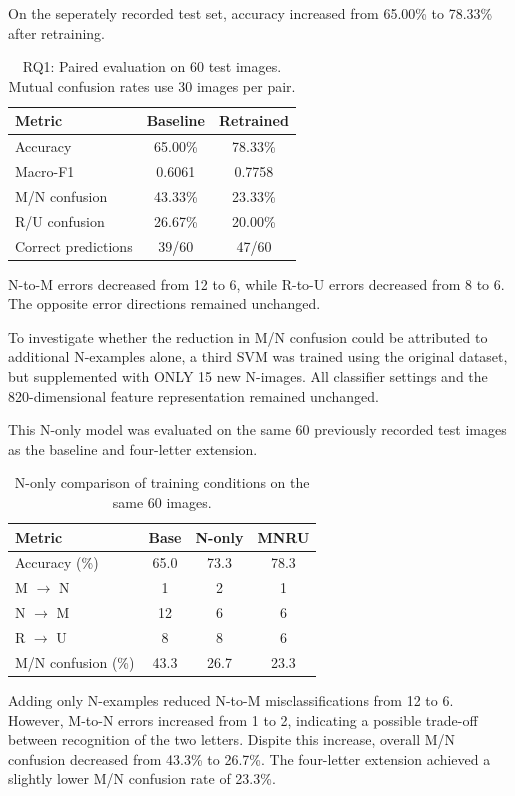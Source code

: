 On the seperately recorded test set, accuracy increased from 65.00\% to 78.33\% after retraining.
\begin{table}[ht]
\centering
\caption{RQ1: Paired evaluation on 60 test images.
Mutual confusion rates use 30 images per pair.}
\label{tab:rq1_results}
\begin{tabular}{lcc}
\toprule
Metric & Baseline & Retrained \\
\midrule
Accuracy & 65.00\% & 78.33\% \\
Macro-F1 & 0.6061 & 0.7758 \\
M/N confusion & 43.33\% & 23.33\% \\
R/U confusion & 26.67\% & 20.00\% \\
Correct predictions & 39/60 & 47/60 \\
\bottomrule
\end{tabular}
\end{table}

N-to-M errors decreased from 12 to 6, while R-to-U errors decreased from 8 to 6. The opposite error directions remained unchanged.

To investigate whether the reduction in M/N confusion could be attributed to additional N-examples alone, a third SVM was trained using the original dataset, but supplemented with ONLY 15 new N-images. All classifier settings and the 820-dimensional feature representation remained unchanged.

This N-only model was evaluated on the same 60 previously recorded test images as the baseline and four-letter extension.

\begin{table}[ht]
\centering
\caption{N-only comparison of training
conditions on the same 60 images.}
\label{tab:n_only}
\begin{tabular}{lccc}
\toprule
Metric & Base & N-only & MNRU \\
\midrule
Accuracy (\%) & 65.0 & 73.3 & 78.3 \\
M $\rightarrow$ N & 1 & 2 & 1 \\
N $\rightarrow$ M & 12 & 6 & 6 \\
R $\rightarrow$ U & 8 & 8 & 6 \\
M/N confusion (\%) & 43.3 & 26.7 & 23.3 \\
\bottomrule
\end{tabular}
\end{table}

Adding only N-examples reduced N-to-M misclassifications from 12 to 6. However, M-to-N errors increased from 1 to 2, indicating a possible trade-off between recognition of the two letters. Dispite this increase, overall M/N confusion decreased from 43.3\% to 26.7\%. The four-letter extension achieved a slightly lower M/N confusion rate of 23.3\%.
